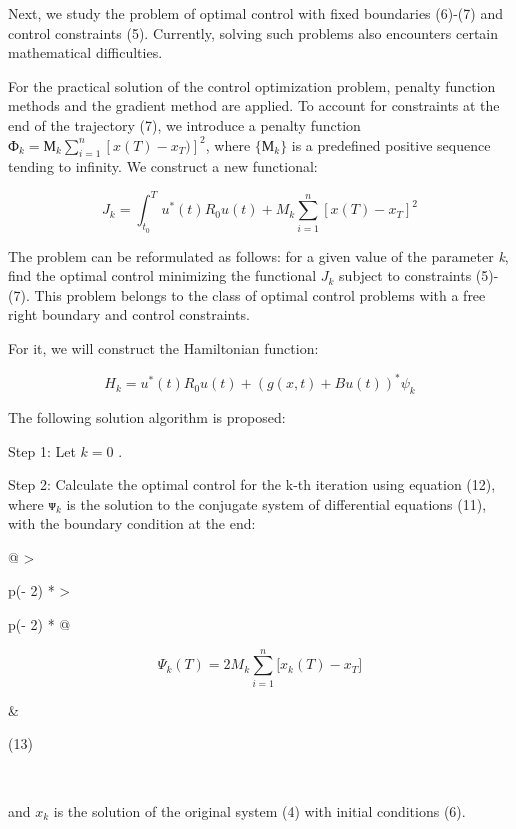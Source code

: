 Next, we study the problem of optimal control with fixed boundaries
(6)-(7) and control constraints (5). Currently, solving such problems
also encounters certain mathematical difficulties.

For the practical solution of the control optimization problem, penalty
function methods and the gradient method are applied. To account for
constraints at the end of the trajectory (7), we introduce a penalty
function
\(Ф_{k} = М_{k}\sum_{i = 1}^{n}\left\lbrack x(T) - x_{T}) \right\rbrack^{2}\),
where \(\{ М_{k}\}\) is a predefined positive sequence tending to
infinity. We construct a new functional:

\[J_{k} =  \int_{t_0}^T u^{*}(t)R_{0}u(t) + M_k\sum_{i=1}^n[x(T)-x_T]^2\]

The problem can be reformulated as follows: for a given value of the
parameter \emph{k}, find the optimal control minimizing the functional
\(J_{k}\)\hspace{0pt} subject to constraints (5)-(7). This problem
belongs to the class of optimal control problems with a free right
boundary and control constraints.

For it, we will construct the Hamiltonian function:

\[H_{k} = u^{*}(t)R_{0}u(t) + (g(x,t) + Bu(t))^{*}\psi_{k}\]

The following solution algorithm is proposed:

Step 1: Let \(k = 0\) .

Step 2: Calculate the optimal control for the k-th iteration using
equation (12), where \(ᴪ_{k}\) is the solution to the conjugate system
of differential equations (11), with the boundary condition at the end:

\begin{longtable}[]{@{}
  >{\raggedright\arraybackslash}p{(\columnwidth - 2\tabcolsep) * }
  >{\raggedright\arraybackslash}p{(\columnwidth - 2\tabcolsep) * }@{}}
\begin{minipage}[b]{\linewidth}\raggedright
\[\Psi_{k}(T) = 2M_{k}\sum_{i = 1}^{n}{\lbrack x_{k}(T) - x_{T}\rbrack}\]
\end{minipage} & \begin{minipage}[b]{\linewidth}\raggedright
(13)
\end{minipage} \\
\end{longtable}

and \(x_{k}\) is the solution of the original system (4) with initial
conditions (6).

